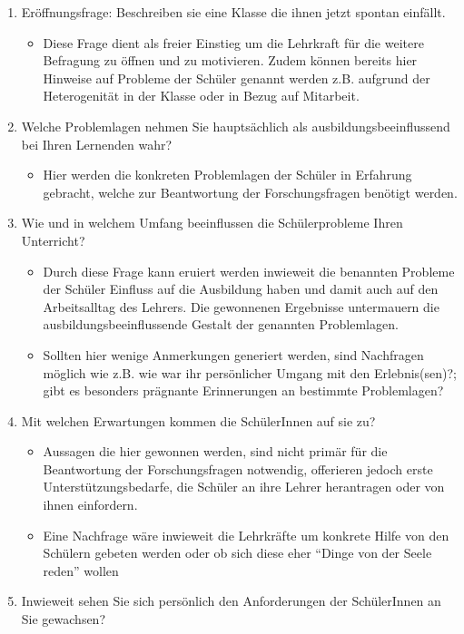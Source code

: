 \begin{enumerate}
	\item Eröffnungsfrage: Beschreiben sie eine Klasse die ihnen jetzt spontan einfällt.
	\begin{itemize}
		\item Diese Frage dient als freier Einstieg um die Lehrkraft für die weitere Befragung zu öffnen und zu motivieren. Zudem können bereits hier Hinweise auf Probleme der Schüler genannt werden z.B. aufgrund der Heterogenität in der Klasse oder in Bezug auf Mitarbeit.
	\end{itemize}
	\item Welche Problemlagen nehmen Sie hauptsächlich als ausbildungsbeeinflussend bei Ihren Lernenden wahr?
	\begin{itemize}
		\item Hier werden die konkreten Problemlagen der Schüler in Erfahrung gebracht, welche zur Beantwortung der Forschungsfragen benötigt werden.
	\end{itemize}
	\item Wie und in welchem Umfang beeinflussen die Schülerprobleme Ihren Unterricht?
	\begin{itemize}
		\item Durch diese Frage kann eruiert werden inwieweit die benannten Probleme der Schüler Einfluss auf die Ausbildung haben und damit auch auf den Arbeitsalltag des Lehrers. Die gewonnenen Ergebnisse untermauern die ausbildungsbeeinflussende Gestalt der genannten Problemlagen.
		\item Sollten hier wenige Anmerkungen generiert werden, sind Nachfragen möglich wie z.B. wie war ihr persönlicher Umgang mit den Erlebnis(sen)?; gibt es besonders prägnante Erinnerungen an bestimmte Problemlagen?
	\end{itemize}
	\item Mit welchen Erwartungen kommen die SchülerInnen auf sie zu?
	\begin{itemize}
		\item Aussagen die hier gewonnen werden, sind nicht primär für die Beantwortung der Forschungsfragen notwendig, offerieren jedoch erste Unterstützungsbedarfe, die Schüler an ihre Lehrer herantragen oder von ihnen einfordern.
		\item Eine Nachfrage wäre inwieweit die Lehrkräfte um konkrete Hilfe von den Schülern gebeten werden oder ob sich diese eher "`Dinge von der Seele reden"' wollen
	\end{itemize}
	\item Inwieweit sehen Sie sich persönlich den Anforderungen der SchülerInnen an Sie gewachsen? 

\end{enumerate}
